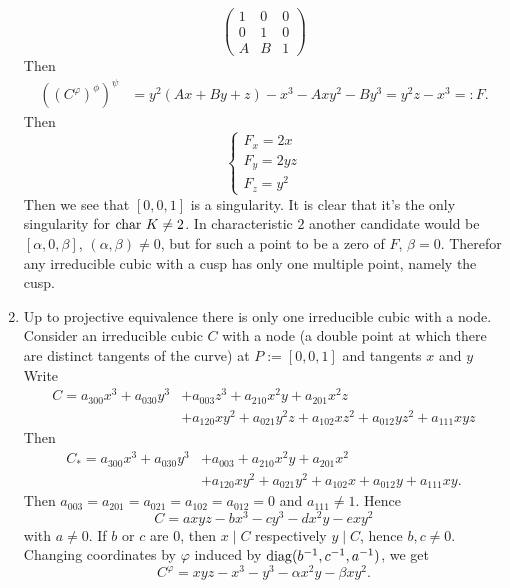 \begin{example}
\begin{enumerate}
$$            \begin{pmatrix}
                1 & 0 & 0\\
                0 & 1 & 0\\
                A & B & 1
            \end{pmatrix}
            $$
            Then 
            \begin{align*}
                ((C^\varphi)^\phi)^\psi &= y^2(Ax+By+z)-x^3-Axy^2-By^3= y^2z-x^3 =: F.
            \end{align*}
            Then 
            $$
                \begin{cases}
                    F_x = 2x\\
                    F_y = 2yz\\
                    F_z = y^2
                \end{cases}
            $$
            Then we see that $[0,0,1]$ is a singularity. It is clear that it's the only singularity for $\mathrm{char} \ K \neq 2$. In characteristic $2$ another candidate would be $[\alpha,0,\beta]$, $(\alpha,\beta )\neq 0$, but for such a point to be a zero of $F$, $\beta =0$. Therefor any irreducible cubic with a cusp has only one multiple point, namely the cusp.
            \item Up to projective equivalence there is only one irreducible cubic with a node. Consider an irreducible cubic $C$ with a node (a double point at which there are distinct tangents of the curve) at $P:=[0,0,1]$ and tangents $x$ and $y$
            Write 
            \begin{align*} 
                C=a_{300} x^3+a_{030}y^3&+a_{003}z^3+a_{210}x^2y+a_{201}x^2z\\&+ a_{120}xy^2+a_{021}y^2z+a_{102}xz^2+a_{012}yz^2+a_{111}xyz
            \end{align*}
            Then 
            \begin{align*} 
                C_\ast = a_{300} x^3+a_{030}y^3&+a_{003}+a_{210}x^2y+a_{201}x^2\\&+ a_{120}xy^2+a_{021}y^2+a_{102}x+a_{012}y+a_{111}xy.
            \end{align*}
            Then $a_{003}=a_{201}=a_{021}=a_{102}=a_{012}=0$ and $a_{111}\neq 1$. Hence
            $$C = axyz-bx^3-cy^3-dx^2y-exy^2$$
            with $a\neq 0$. If $b$ or $c$ are $0$, then $x\mid C$ respectively $y\mid C$, hence $b,c\neq 0$. Changing coordinates by $\varphi$ induced by $\mathrm{diag}(b^{-1},c^{-1},a^{-1})$, we get 
            $$C^\varphi = xyz-x^3-y^3-\alpha x^2y-\beta xy^2.$$

\end{enumerate}
\end{example}
